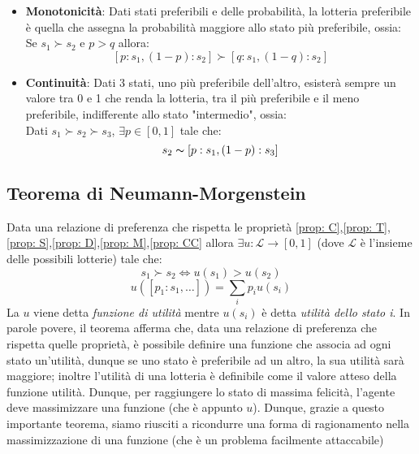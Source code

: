 \begin{itemize}
    \item \textbf{Monotonicità}: Dati stati preferibili e delle probabilità, la lotteria preferibile è quella che assegna la probabilità maggiore allo stato più preferibile, ossia:\\
    Se $ s_1 \succ s_2 $ e $p > q$ allora:
    \begin{equation} \label{prop: M}
        [p:s_1,(1-p):s_2] \succ [q:s_1,(1-q):s_2]
    \end{equation}

    \item \textbf{Continuità}: Dati 3 stati, uno più preferibile dell'altro, esisterà sempre un valore tra 0 e 1 che renda la lotteria, tra il più preferibile e il meno preferibile, indifferente allo stato "intermedio", ossia:\\
    Dati $s_1 \succ s_2 \succ s_3$, $\exists p \in [0,1]$ tale che:
    \begin{equation} \label{prop: CC}
        s_2 \thicksim [p: s_1, (1-p): s_3]
    \end{equation}
\end{itemize}


\subsection{Teorema di Neumann-Morgenstein}
Data una relazione di preferenza che rispetta le proprietà \eqref{prop: C},\eqref{prop: T},\eqref{prop: S},\eqref{prop: D},\eqref{prop: M},\eqref{prop: CC} 
allora $\exists u: \mathcal{L} \longrightarrow [0,1]$ (dove $\mathcal{L}$ è l'insieme delle possibili lotterie) tale che:
\begin{equation}
        s_1 \succ s_2 \Longleftrightarrow u(s_1) > u(s_2)
\end{equation}
\begin{equation}
    u([p_1:s_1, \dots]) = \displaystyle \sum_i p_i u(s_i)
\end{equation}
La $u$ viene detta \textit{funzione di utilità} mentre $u(s_i)$ è detta \textit{utilità dello stato i}.
In parole povere, il teorema afferma che, data una relazione di preferenza che rispetta quelle proprietà, è possibile definire
una funzione che associa ad ogni stato un'utilità, dunque se uno stato è preferibile ad un altro, la sua utilità sarà maggiore; inoltre l'utilità di una lotteria è definibile come il valore atteso della funzione utilità. Dunque, per raggiungere lo stato di massima felicità, l'agente deve massimizzare una funzione (che è appunto $u$).
Dunque, grazie a questo importante teorema, siamo riusciti a ricondurre una forma di ragionamento nella massimizzazione di una funzione (che è un problema facilmente attaccabile)
